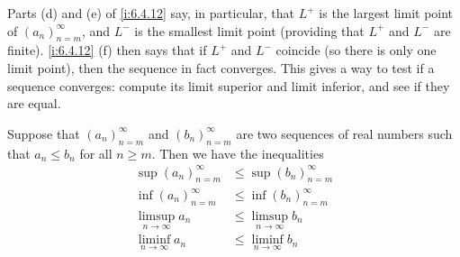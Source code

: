 \begin{note}
  Parts (d) and (e) of \cref{i:6.4.12} say, in particular, that \(L^+\) is the largest limit point of \((a_n)_{n = m}^\infty\), and \(L^-\) is the smallest limit point
  (providing that \(L^+\) and \(L^-\) are finite).
  \cref{i:6.4.12} (f) then says that if \(L^+\) and \(L^-\) coincide (so there is only one limit point), then the sequence in fact converges.
  This gives a way to test if a sequence converges: compute its limit superior and limit inferior, and see if they are equal.
\end{note}

\begin{lem}\label{i:6.4.13}
  Suppose that \((a_n)_{n = m}^\infty\) and \((b_n)_{n = m}^\infty\) are two sequences of real numbers such that \(a_n \leq b_n\) for all \(n \geq m\).
  Then we have the inequalities
  \begin{align*}
    \sup(a_n)_{n = m}^\infty   & \leq \sup(b_n)_{n = m}^\infty   \\
    \inf(a_n)_{n = m}^\infty   & \leq \inf(b_n)_{n = m}^\infty   \\
    \limsup_{n \to \infty} a_n & \leq \limsup_{n \to \infty} b_n \\
    \liminf_{n \to \infty} a_n & \leq \liminf_{n \to \infty} b_n
  \end{align*}
\end{lem}

